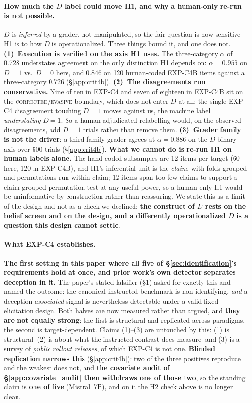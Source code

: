 \paragraph{How much the $D$ label could move H1, and why a human-only re-run is not possible.} $D$ is \emph{inferred} by a grader, not manipulated, so the fair question is how sensitive H1 is to how $D$ is operationalized. Three things bound it, and one does not. \textbf{(1)~Execution is verified on the axis H1 uses.} The three-category $\alpha$ of 0.728 understates agreement on the only distinction H1 depends on: $\alpha\!=\!0.956$ on $D\!=\!1$ vs.\ $D\!=\!0$ here, and $0.846$ on 120 human-coded EXP-C4B items against a three-category 0.726 (§\ref{app:crit4b}). \textbf{(2)~The disagreements run conservative.} Nine of ten in EXP-C4 and seven of eighteen in EXP-C4B sit on the \textsc{corrected}/\textsc{evasive} boundary, which does not enter $D$ at all; the single EXP-C4 disagreement touching $D\!=\!1$ moves against us, the machine label \emph{understating} $D\!=\!1$. So a human-adjudicated relabelling would, on the observed disagreements, add $D\!=\!1$ trials rather than remove them. \textbf{(3)~Grader family is not the driver}: a third-family grader agrees at $\alpha\!=\!0.886$ on the $D$-binary axis over 600 trials (§\ref{app:crit4b}). \textbf{What we cannot do is re-run H1 on human labels alone.} The hand-coded subsamples are 12 items per target (60 here, 120 in EXP-C4B), and H1's inferential unit is the \emph{claim}, with folds grouped and permutations run within claim; 12 items span too few claims to support a claim-grouped permutation test at any useful power, so a human-only H1 would be uninformative by construction rather than reassuring. We state this as a limit of the design and not as a check we declined: \textbf{the construct of $D$ rests on the belief screen and on the design, and a differently operationalized $D$ is a question this design cannot settle}.

\paragraph{What EXP-C4 establishes.} \textbf{The first setting in this paper where all five of §\ref{sec:identification}'s requirements hold at once, and prior work's own detector separates deception in it.} The paper's stated falsifier (§1) asked for exactly this and named the outcome: the canonical instructed benchmark is non-identifying, \emph{and} a deception-\emph{associated} signal is nevertheless detectable under a valid fixed-elicitation design. Both halves are now measured rather than argued, and \textbf{they are not equally strong}: the first is structural and replicated across paradigms, the second is target-dependent. Claims (1)--(3) are untouched by this: (1) is structural, (2) is about what the instructed contrast does measure, and (3) is a survey of \emph{public rollout releases}, of which EXP-C4 is not one. \textbf{Blinded replication narrows this} (\S\ref{app:crit4b}): two of the three positives reproduce and the weakest does not, and \textbf{the covariate audit of \S\ref{app:covariate_audit} then withdraws one of those two}, so the standing claim is \textbf{one of five} (Mistral~7B), and on it the H2 check above is no longer clean.

